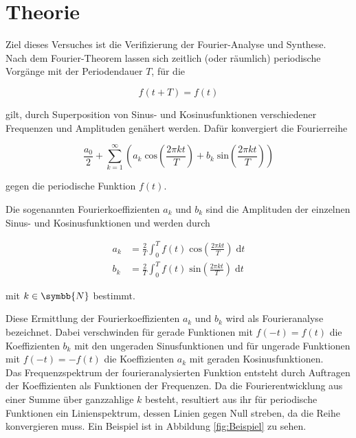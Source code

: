 \section{Theorie}
\label{sec:Theorie}

Ziel dieses Versuches ist die Verifizierung der Fourier-Analyse und Synthese. \\

Nach dem Fourier-Theorem lassen sich zeitlich (oder räumlich) periodische Vorgänge mit der Periodendauer
$T$, für die

\begin{equation}
    f(t + T) = f(t) 
\end{equation}

gilt, durch Superposition von Sinus- und Kosinusfunktionen verschiedener Frequenzen und Amplituden genähert werden.
Dafür konvergiert die Fourierreihe

\begin{equation}
    \label{eqn:Entwicklung}
    \frac{a_0}{2} + \sum^\infty_{k = 1} \left(a_k \;  \text{cos}\left(\frac{2 \pi k t}{T} \right) + b_k \; \text{sin}
    \left(\frac{2 \pi k t}{T} \right) \right)
\end{equation}

gegen die periodische Funktion $f(t)$.   

Die sogenannten Fourierkoeffizienten $a_k$ und $b_k$ sind die Amplituden der einzelnen Sinus- und Kosinusfunktionen 
 und werden durch 

\begin{align}
    \label{eqn:Koeff}
    a_k &= \frac{2}{T} \int_0^T f(t) \; \text{cos}\left(\frac{2 \pi k t}{T} \right) \; \text{d}t \\
    b_k &= \frac{2}{T} \int_0^T f(t) \; \text{sin}\left(\frac{2 \pi k t}{T} \right) \; \text{d}t
\end{align}

mit $k \in \symbb{N}$ bestimmt. 

Diese Ermittlung der Fourierkoeffizienten $a_k$ und $b_k$ wird als Fourieranalyse bezeichnet.
Dabei verschwinden für gerade Funktionen mit $f(-t) = f(t)$ die Koeffizienten $b_k$ mit den ungeraden Sinusfunktionen und für
ungerade Funktionen mit $f(-t) = -f(t)$ die Koeffizienten $a_k$ mit geraden Kosinusfunktionen. \\

Das Frequenzspektrum der fourieranalysierten Funktion entsteht durch Auftragen der Koeffizienten als Funktionen der Frequenzen.
Da die Fourierentwicklung aus einer Summe über ganzzahlige $k$ besteht, resultiert aus ihr für periodische Funktionen ein Linienspektrum, dessen
Linien gegen Null streben, da die Reihe konvergieren muss. Ein Beispiel ist in 
Abbildung \ref{fig:Beispiel} zu sehen.

